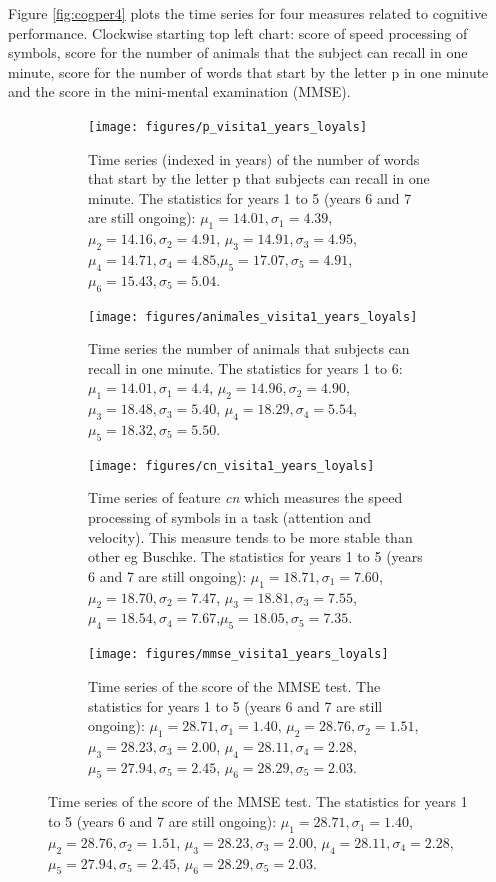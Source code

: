 \documentclass[11pt]{article}
\theoremstyle{definition}
\theoremstyle{remark}
\begin{document}
Figure \ref{fig:cogper4} plots the time series for four measures related to cognitive performance. Clockwise starting top left chart: score of speed processing of symbols, score for the number of animals that the subject can recall in one minute, score for the number of words that start by the letter p in one minute and the score in the mini-mental examination (MMSE).

\begin{figure}[!htb]
    \centering
    \begin{subfigure}[t]{0.45\textwidth}
        \centering
        \texttt{[image: figures/p\_visita1\_years\_loyals]}
        \caption{Time series (indexed in years) of the  number of words that start by the letter p that subjects can recall in one minute. The statistics for years 1 to 5 (years 6 and 7 are still ongoing): $\mu_{1}=14.01, \sigma_{1}=4.39$, $\mu_{2}=14.16, \sigma_{2}=4.91$, $\mu_{3}=14.91, \sigma_{3}=4.95$, $\mu_{4}=14.71, \sigma_{4}=4.85$,$\mu_{5}=17.07,\sigma_{5}=4.91$, $\mu_{6}=15.43,\sigma_{5}=5.04$.}
    \end{subfigure}
    \hfill
    \begin{subfigure}[t]{0.45\textwidth}
        \centering
        \texttt{[image: figures/animales\_visita1\_years\_loyals]}
        \caption{Time series the  number of animals that subjects can recall in one minute. The statistics for years 1 to 6: $\mu_{1}=14.01, \sigma_{1}=4.4$, $\mu_{2}=14.96, \sigma_{2}=4.90$, $\mu_{3}=18.48, \sigma_{3}=5.40$, $\mu_{4}=18.29, \sigma_{4}=5.54$,$\mu_{5}=18.32,\sigma_{5}=5.50$.}
    \end{subfigure}%
    
     \begin{subfigure}[t]{0.45\textwidth}
        \centering
        \texttt{[image: figures/cn\_visita1\_years\_loyals]}
        \caption{Time series of feature \emph{cn} which measures the speed processing of symbols in a task (attention and velocity). This measure tends to be more stable than other eg Buschke. The statistics for years 1 to 5 (years 6 and 7 are still ongoing): $\mu_{1}=18.71, \sigma_{1}=7.60$, $\mu_{2}=18.70, \sigma_{2}=7.47$, $\mu_{3}=18.81, \sigma_{3}=7.55$, $\mu_{4}=18.54, \sigma_{4}=7.67$,$\mu_{5}=18.05,\sigma_{5}=7.35$.}
    \end{subfigure}
    \hfill
    \begin{subfigure}[t]{0.45\textwidth}
        \centering
        \texttt{[image: figures/mmse\_visita1\_years\_loyals]}
        \caption{Time series of the score of the MMSE test. The statistics for years 1 to 5 (years 6 and 7 are still ongoing): $\mu_{1}=28.71, \sigma_{1}=1.40$, $\mu_{2}=28.76, \sigma_{2}=1.51$, $\mu_{3}=28.23, \sigma_{3}=2.00$, $\mu_{4}=28.11, \sigma_{4}=2.28$,$\mu_{5}=27.94,\sigma_{5}=2.45$, $\mu_{6}=28.29,\sigma_{5}=2.03$.}
    \end{subfigure}%
   

\end{figure}
\end{document}
